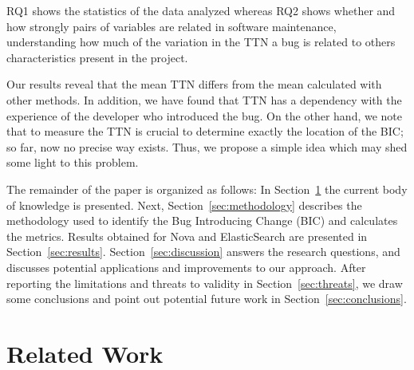 \documentclass[10pt, conference]{IEEEtran}
\begin{document}
RQ1 shows the statistics of the data analyzed whereas RQ2 shows whether and how strongly pairs of variables are related in software maintenance, understanding how much of the variation in the TTN a bug is related to others characteristics present in the project.


Our results reveal that the mean TTN differs from the mean calculated with other methods. In addition, we have found that TTN has a dependency with the experience of the developer who introduced the bug. On the other hand, we note that to measure the TTN is crucial to determine exactly the location of the BIC; so far, now no precise way exists. Thus, we propose a simple idea which may shed some light to this problem.


The remainder of the paper is organized as follows: In Section~\ref{sec:relatedwork} the current body of knowledge is presented. Next, Section~\ref{sec:methodology} describes the methodology used to identify the Bug Introducing Change (BIC) and calculates the metrics. Results obtained for Nova and ElasticSearch are presented in Section~\ref{sec:results}. Section~\ref{sec:discussion} answers the research questions, and discusses potential applications and improvements to our approach. After reporting the limitations and threats to validity in Section~\ref{sec:threats}, we draw some conclusions and point out potential future work in Section~\ref{sec:conclusions}.

\section{Related Work}
\label{sec:relatedwork}
\end{document}
